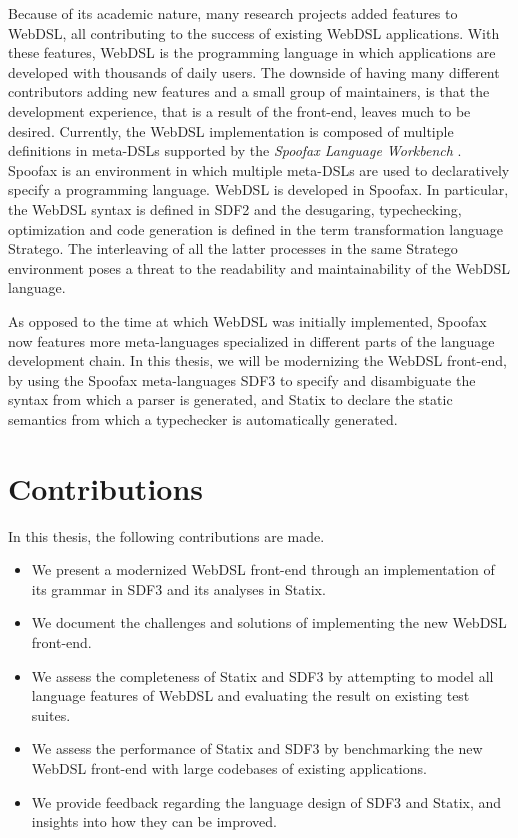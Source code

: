   Because of its academic nature, many research projects added features to WebDSL, all contributing to the success of existing WebDSL applications. With these features, WebDSL is the programming language in which applications are developed with thousands of daily users. The downside of having many different contributors adding new features and a small group of maintainers, is that the development experience, that is a result of the front-end, leaves much to be desired. Currently, the WebDSL implementation is composed of multiple definitions in meta-DSLs supported by the \textit{Spoofax Language Workbench} \autocite{KatsV10}. Spoofax is an environment in which multiple meta-DSLs are used to declaratively specify a programming language. WebDSL is developed in Spoofax. In particular, the WebDSL syntax is defined in SDF2 and the desugaring, typechecking, optimization and code generation is defined in the term transformation language Stratego. The interleaving of all the latter processes in the same Stratego environment poses a threat to the readability and maintainability of the WebDSL language.

  As opposed to the time at which WebDSL was initially implemented, Spoofax now features more meta-languages specialized in different parts of the language development chain. In this thesis, we will be modernizing the WebDSL front-end, by using the Spoofax meta-languages SDF3 to specify and disambiguate the syntax from which a parser is generated, and Statix to declare the static semantics from which a typechecker is automatically generated.

  \section{\label{sec:contributions}Contributions}
    In this thesis, the following contributions are made.

    \begin{itemize}
      \item We present a modernized WebDSL front-end through an implementation of its grammar in SDF3 and its analyses in Statix.
      \item We document the challenges and solutions of implementing the new WebDSL front-end.
      \item We assess the completeness of Statix and SDF3 by attempting to model all language features of WebDSL and evaluating the result on existing test suites.
      \item We assess the performance of Statix and SDF3 by benchmarking the new WebDSL front-end with large codebases of existing applications.
      \item We provide feedback regarding the language design of SDF3 and Statix, and insights into how they can be improved.
    \end{itemize}

